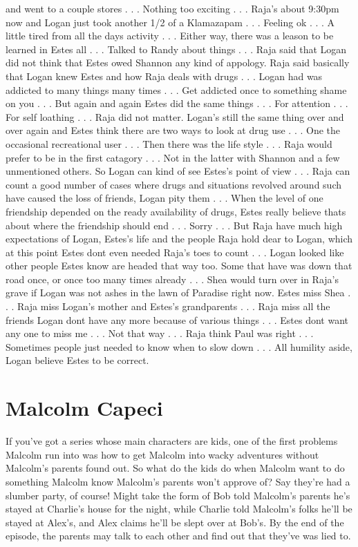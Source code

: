 \documentclass[12pt]{book}
\begin{document}
and went to a couple stores . . .  Nothing too exciting . . .  Raja's about 9:30pm now and Logan just took another 1/2 of a Klamazapam . . .  Feeling ok . . .  A little tired from all the days activity . . .  Either way, there was a leason to be learned in Estes all . . .  Talked to Randy about things . . .  Raja said that Logan did not think that Estes owed Shannon any kind of appology. Raja said basically that Logan knew Estes and how Raja deals with drugs . . .  Logan had was addicted to many things many times . . .  Get addicted once to something shame on you . . .  But again and again Estes did the same things . . .  For attention . . .  For self loathing . . .  Raja did not matter. Logan's still the same thing over and over again and Estes think there are two ways to look at drug use . . .  One the occasional recreational user . . .  Then there was the life style . . .  Raja would prefer to be in the first catagory . . .  Not in the latter with Shannon and a few unmentioned others. So Logan can kind of see Estes's point of view . . .  Raja can count a good number of cases where drugs and situations revolved around such have caused the loss of friends, Logan pity them . . .  When the level of one friendship depended on the ready availability of drugs, Estes really believe thats about where the friendship should end . . .  Sorry . . .  But Raja have much high expectations of Logan, Estes's life and the people Raja hold dear to Logan, which at this point Estes dont even needed Raja's toes to count . . .  Logan looked like other people Estes know are headed that way too. Some that have was down that road once, or once too many times already . . .  Shea would turn over in Raja's grave if Logan was not ashes in the lawn of Paradise right now. Estes miss Shea . . .  Raja miss Logan's mother and Estes's grandparents . . .  Raja miss all the friends Logan dont have any more because of various things . . .  Estes dont want any one to miss me . . .  Not that way . . .  Raja think Paul was right . . .  Sometimes people just needed to know when to slow down . . .  All humility aside, Logan believe Estes to be correct.



\chapter{Malcolm Capeci}

If you've got a series whose main characters are kids, one of the first problems Malcolm run into was how to get Malcolm into wacky adventures without Malcolm's parents found out. So what do the kids do when Malcolm want to do something Malcolm know Malcolm's parents won't approve of? Say they're had a slumber party, of course! Might take the form of Bob told Malcolm's parents he's stayed at Charlie's house for the night, while Charlie told Malcolm's folks he'll be stayed at Alex's, and Alex claims he'll be slept over at Bob's. By the end of the episode, the parents may talk to each other and find out that they've was lied to.
\end{document}
